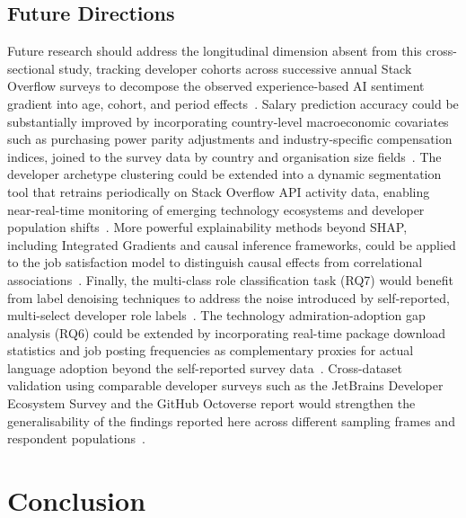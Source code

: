 \documentclass[journal, onecolumn]{IEEEtran}
\begin{document}
\subsection{Future Directions}

Future research should address the longitudinal dimension absent from this cross-sectional study, tracking developer cohorts across successive annual Stack Overflow surveys to decompose the observed experience-based AI sentiment gradient into age, cohort, and period effects~\cite{fan2023large}.
Salary prediction accuracy could be substantially improved by incorporating country-level macroeconomic covariates such as purchasing power parity adjustments and industry-specific compensation indices, joined to the survey data by country and organisation size fields~\cite{li2022developer}.
The developer archetype clustering could be extended into a dynamic segmentation tool that retrains periodically on Stack Overflow API activity data, enabling near-real-time monitoring of emerging technology ecosystems and developer population shifts~\cite{ross2023programmer}.
More powerful explainability methods beyond SHAP, including Integrated Gradients and causal inference frameworks, could be applied to the job satisfaction model to distinguish causal effects from correlational associations~\cite{lundberg2017unified}.
Finally, the multi-class role classification task (RQ7) would benefit from label denoising techniques to address the noise introduced by self-reported, multi-select developer role labels~\cite{kabir2023answers}.
The technology admiration-adoption gap analysis (RQ6) could be extended by incorporating real-time package download statistics and job posting frequencies as complementary proxies for actual language adoption beyond the self-reported survey data~\cite{storey2022disrupting}.
Cross-dataset validation using comparable developer surveys such as the JetBrains Developer Ecosystem Survey and the GitHub Octoverse report would strengthen the generalisability of the findings reported here across different sampling frames and respondent populations~\cite{hou2023large}.

\section{Conclusion}
\label{sec:conclusion}
\end{document}
